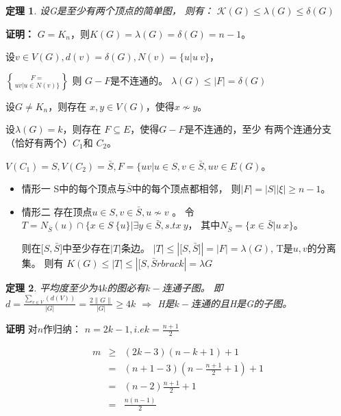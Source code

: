 \documentclass[UTF8]{ctexart}
\newtheorem{thm}{定理}
\begin{document}
    \begin{thm}
    设G是至少有两个顶点的简单图，
    则有：
    $ \mathcal{K}(G)  \leq \lambda(G)  \leq \delta(G)$
    \end{thm}
    
    \textbf{证明：}
    $ G=K_{n} $，则$ \mathit{K}(G)=\lambda(G)=\delta(G)=n-1$。
    
    设$ v \in V(G), d(v)=\delta(G), N(v) = \lbrace u| u~v \rbrace $，
    
    $ F = \brace uv|u \in N(v) \rbrace $ 则 $G-F$是不连通的。
    $\lambda(G) \leq |F|= \delta(G) $
    
    设$ G \neq K_{n}$，则存在 $ x,y \in V(G) $，使得$x \not\sim y$。
    
    设$ \lambda(G)=k $，则存在 $ F \subseteq E $，使得$G-F$是不连通的，至少
    有两个连通分支（恰好有两个）$ C_{1}$和 $ C_{2}$。
    
    $V(C_{1})=S, V(C_{2})=\bar{S}, F= \lbrace uv| u \in S, v \in \bar{S}, uv \in E(G)$。
    
    \begin{itemize}
    \item 情形一 S中的每个顶点与$ \bar{S} $中的每个顶点都相邻，
    则$|F| = |S||\xi| \geq n-1$。
    \item 情形二 存在顶点$u\in S,v \in \bar{S}, u\not\sim v$  。
    令$T=N_{\bar{S}}(u) \cap \lbrace x\in S \ \lbrace u \rbrace | \exists y \in \bar{S}, s.t x~y$，
    其中$N_{\bar{S}}= \lbrace x \in \bar{S} | u~x \rbrace$。
    
    则在$\lbrack S,\bar{S} \rbrack $中至少存在$|T|$条边。
    $|T| \leq | \lbrack S, \bar{S} \rbrack | = |F| = \lambda(G) $,
    T是$u,v$的分离集。
    则有 $\mathit{K}(G) \leq |T| \leq | \lbrack S, \bar{S} rbrack | = \lambda{G}  $
    
    \end{itemize}
    
    \begin{thm}
    平均度至少为$4k$的图必有$k-$连通子图。
    即$d = \frac{ \sum_{ v\in V }( d(V) ) }{|G|} = \frac{2\| G \|}{|G|} \geq 4k$
    $\Longrightarrow$
    H是$k-$连通的且H是G的子图。
    \end{thm}
    
    \textbf{证明}
    对$n$作归纳：
    $n=2k-1 ,i.e k = \frac{n+1}{2} $ 
    
    \begin{eqnarray*}
    m &\geq & (2k-3)(n-k+1)+1\\
      & =   & ( n+1-3 )( n - \frac{n+1}{2} +1 )+1 \\
      & =   & ( n - 2 ) \frac{n+1}{2} + 1 \\
      & =   & \frac{n(n-1)}{2}
    \end{eqnarray*}
    
\end{document}
